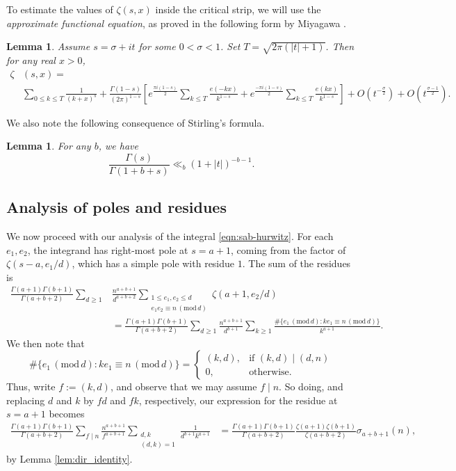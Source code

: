 \documentclass[12pt]{amsart}
\newtheorem{lemma}[theorem]{Lemma}
\numberwithin{equation}{section}
\numberwithin{theorem}{section}
\renewcommand{\pmod}[1]{\,\left(\mathrm{mod}\,#1\right)}
\begin{document}
To estimate the values of $\zeta(s, x)$ inside the critical strip, we will use the {\itshape approximate functional equation}, as proved in the following form by Miyagawa \cite{miyagawa}.

\begin{lemma}\label{lem:AFE}
	Assume $s = \sigma + i t$ for some $0 < \sigma < 1 $.  Set $T = \sqrt{2 \pi (|t|+1)}$.  Then for any real $x > 0$,
	\begin{align*}
		\zeta&(s,x) = \\
			&\sum_{0 \leq k \leq T} \frac{1}{(k+x)^s} 
			+ \frac{\Gamma(1-s)}{(2\pi)^{1-s}} \left[ e^{\frac{\pi i (1-s)}{2}}\sum_{k \leq T} \frac{e(-kx)}{k^{1-s}} + e^{\frac{-\pi i (1-s)}{2}}\sum_{k \leq T} \frac{e(kx)}{k^{1-s}}\right]
			+ O(t^{-\frac{\sigma}{2}}) + O(t^{\frac{\sigma-1}{2}}).
	\end{align*}
\end{lemma}

We also note the following consequence of Stirling's formula.
\begin{lemma}\label{lem:gamma_quotient} 
	For any $b$, we have
	\[
		\frac{\Gamma(s)}{\Gamma(1 + b + s)} \ll_b (1 + |t|)^{-b - 1}.
	\]
\end{lemma}

\subsection{Analysis of poles and residues}

We now proceed with our analysis of the integral \eqref{eqn:sab-hurwitz}.
For each $e_1,e_2$, the integrand has right-most pole at $s=a+1$, coming from the factor of $\zeta(s-a,e_1/d)$, which has a simple pole with residue $1$.  The sum of the residues is
\begin{align*}
\frac{\Gamma(a+1)\Gamma(b+1)}{\Gamma(a+b+2)} \sum_{d \geq 1} &\frac{n^{a+b+1}}{d^{a+b+2}}  \sum_{\substack{1 \leq e_1,e_2 \leq d \\ e_1e_2 \equiv n \pmod{d}}} \zeta(a+1,e_2/d) \\
	&= \frac{\Gamma(a+1)\Gamma(b+1)}{\Gamma(a+b+2)} \sum_{d \geq 1} \frac{n^{a+b+1}}{d^{b+1}} \sum_{k \geq 1} \frac{\#\{e_1 \pmod{d} : ke_1 \equiv n \pmod{d}\}}{k^{a+1}}.
\end{align*}
We then note that 
\[
	\#\{e_1 \pmod{d} : ke_1 \equiv n \pmod{d}\}
	= \begin{cases}
		(k,d), & \text{if } (k,d) \mid (d,n) \\
		0, & \text{otherwise.}
	\end{cases}
\]
Thus, write $f := (k,d)$, and observe that we may assume $f \mid n$.  So doing, and replacing $d$ and $k$ by $fd$ and $fk$, respectively, our expression for the residue at $s=a+1$ becomes
\begin{align*}
	\frac{\Gamma(a+1)\Gamma(b+1)}{\Gamma(a+b+2)} \sum_{f \mid n} \frac{n^{a+b+1}}{f^{a+b+1}}
		\sum_{\substack{d,k \\ (d,k)=1}} \frac{1}{d^{b+1} k^{a+1}}
		&= \frac{\Gamma(a+1)\Gamma(b+1)}{\Gamma(a+b+2)} \frac{\zeta(a+1)\zeta(b+1)}{\zeta(a+b+2)} \sigma_{a+b+1}(n),
\end{align*}
by Lemma \ref{lem:dir_identity}.
\end{document}
